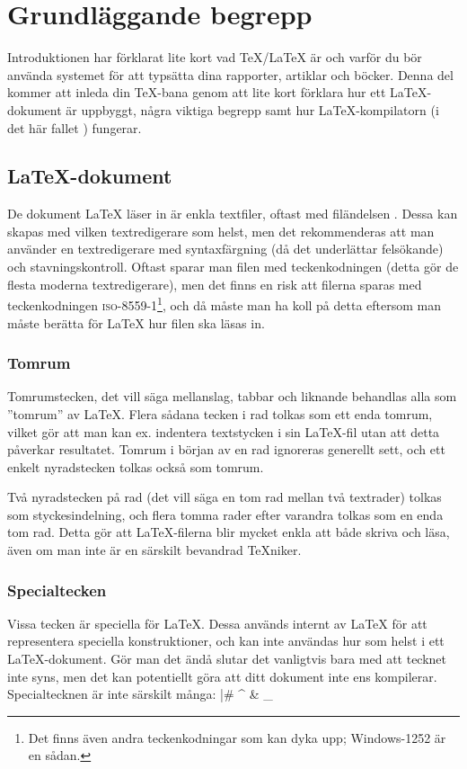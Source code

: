 \documentclass[lang=sv,ptsize=10pt,font=none,nomath,titles=bf,../../a4.tex]{subfiles}
\begin{document}
\section{Grundläggande begrepp}\label{sec:1}
Introduktionen har förklarat lite kort vad \TeX/\LaTeX{} är och varför du
bör använda systemet för att typsätta dina rapporter, artiklar och böcker.
Denna del kommer att inleda din \TeX-bana genom att lite kort förklara hur
ett \LaTeX-dokument är uppbyggt, några viktiga begrepp samt hur
\LaTeX-kompilatorn (i det här fallet ) fungerar.

\subsection{\LaTeX-dokument}
De dokument \LaTeX{} läser in är enkla textfiler, oftast med filändelsen
. Dessa kan skapas med vilken textredigerare som helst,
men det rekommenderas att man använder
en textredigerare med syntaxfärgning (då det underlättar felsökande) och
stavningskontroll. Oftast sparar man filen med teckenkodningen \UTF{} 
(detta gör de flesta moderna textredigerare), men det finns en risk att
filerna sparas med teckenkodningen \textsc{iso-8559-1}\footnote{Det finns 
även andra teckenkodningar som kan dyka upp{;} Windows-1252 är en sådan.}, 
och då måste man ha koll på detta eftersom man måste berätta för \LaTeX{}
hur filen ska läsas in.

\subsubsection{Tomrum}
Tomrumstecken, det vill säga mellanslag, tabbar och liknande behandlas
alla som ”tomrum” av \LaTeX{}. Flera sådana tecken i rad tolkas som ett
enda tomrum, vilket gör att man kan ex. indentera textstycken i sin
\LaTeX-fil utan att detta påverkar resultatet. Tomrum i början av en rad
ignoreras generellt sett, och ett enkelt nyradstecken tolkas också som
tomrum.

Två nyradstecken på rad (det vill säga en tom rad mellan två textrader) tolkas som
styckesindelning, och flera tomma rader efter varandra tolkas som en enda
tom rad. Detta gör att \LaTeX{}-filerna blir mycket enkla att både skriva
och läsa, även om man inte är en särskilt bevandrad \TeX{}niker.

\subsubsection{Specialtecken}
Vissa tecken är speciella för \LaTeX{}. Dessa används internt av \LaTeX{} 
för att representera speciella konstruktioner, och kan inte användas hur som helst i ett \LaTeX-dokument. Gör man det ändå
slutar det vanligtvis bara med att tecknet inte syns, men det kan
potentiellt göra att ditt dokument inte ens kompilerar. Specialtecknen
är inte särskilt många:
\latex|# ^ & _ { } ~ \ %
\end{document}

